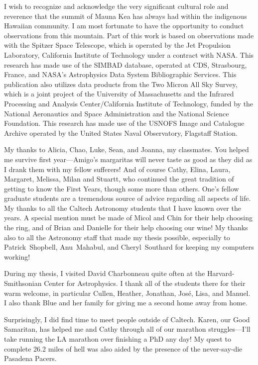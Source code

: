 \begin{acknowledgements}
I wish to recognize and acknowledge the very significant cultural role and reverence that the summit of Mauna Kea has
always had within the indigenous Hawaiian community.  I am most fortunate to have the opportunity to conduct
observations from this mountain.  Part of this work is based on observations made with the Spitzer Space Telescope,
which is operated by the Jet Propulsion Laboratory, California Institute of Technology under a contract with NASA.\@
This research has made use of the SIMBAD database, operated at CDS, Strasbourg, France, and NASA's Astrophysics Data
System Bibliographic Services.  This publication also utilizes data products from the Two Micron All Sky Survey, which
is a joint project of the University of Massachusetts and the Infrared Processing and Analysis Center/California
Institute of Technology, funded by the National Aeronautics and Space Administration and the National Science
Foundation.  This research has made use of the USNOFS Image and Catalogue Archive operated by the United States Naval
Observatory, Flagstaff Station.

My thanks to Alicia, Chao, Luke, Sean, and Joanna, my classmates.  You helped me survive first year---Amigo's margaritas
will never taste as good as they did as I drank them with my fellow sufferers!  And of course Cathy, Elina, Laura,
Margaret, Melissa, Milan and Stuartt, who continued the great tradition of getting to know the First Years, though some
more than others.  One's fellow graduate students are a tremendous source of advice regarding all aspects of life.  My
thanks to all the Caltech Astronomy students that I have known over the years.  A special mention must be made of Micol
and Chin for their help choosing the ring, and of Brian and Danielle for their help choosing our wine!  My thanks also
to all the Astronomy staff that made my thesis possible, especially to Patrick~Shopbell, Anu~Mahabul, and
Cheryl~Southard for keeping my computers working!

During my thesis, I visited David Charbonneau quite often at the Harvard-Smithsonian Center for Astrophysics.  I thank
all of the students there for their warm welcome, in particular Cullen, Heather, Jonathan, Jos\'{e}, Lisa, and Manuel.
I also thank Blue and her family for giving me a second home away from home.

Surprisingly, I did find time to meet people outside of Caltech.  Karen, our Good Samaritan, has helped me and Cathy
through all of our marathon struggles---I'll take running the LA marathon over finishing a PhD any day!  My quest to
complete 26.2 miles of hell was also aided by the presence of the never-say-die Pasadena Pacers.



\end{acknowledgements}
